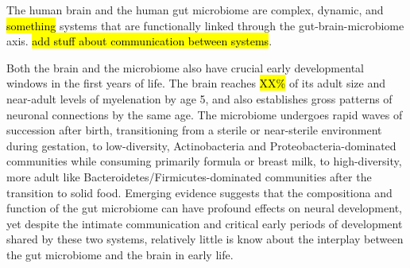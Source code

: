 The human brain and the human gut microbiome
are complex, dynamic, and \hl{something} systems
that are functionally linked through the gut-brain-microbiome axis.
\hl{add stuff about communication between systems}.

Both the brain and the microbiome also have crucial
early developmental windows in the first years of life.
The brain reaches \hl{XX\%} of its adult size
and near-adult levels of myelenation by age 5,
and also establishes gross patterns of neuronal connections
by the same age.
The microbiome undergoes rapid waves of succession after birth,
transitioning from a sterile or near-sterile environment during gestation,
to low-diversity, Actinobacteria and Proteobacteria-dominated communities
while consuming primarily formula or breast milk,
to high-diversity, more adult like Bacteroidetes/Firmicutes-dominated
communities after the transition to solid food.
Emerging evidence suggests that the compositiona and function
of the gut microbiome can have profound effects on neural development,
yet despite the intimate communication
and critical early periods of development shared by these two systems,
relatively little is know about the interplay
between the gut microbiome and the brain in early life.
